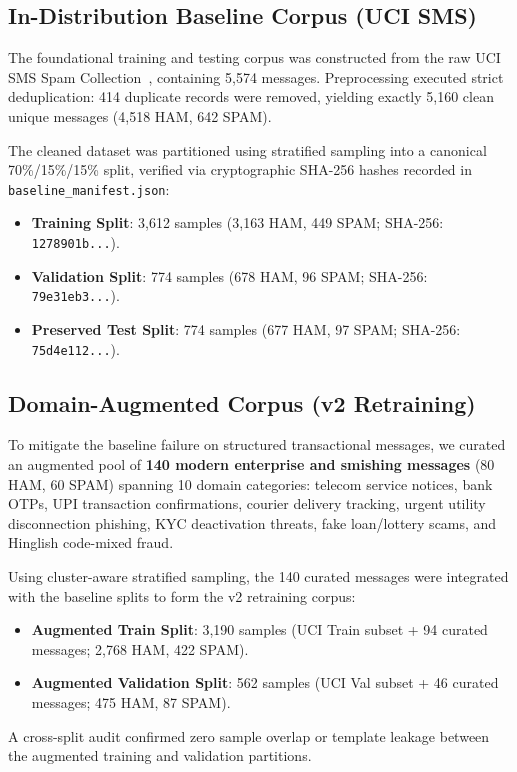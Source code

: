 \documentclass[conference]{IEEEtran}
\begin{document}
\subsection{In-Distribution Baseline Corpus (UCI SMS)}
The foundational training and testing corpus was constructed from the raw UCI SMS Spam Collection~\cite{almeida2011sms}, containing 5,574 messages. Preprocessing executed strict deduplication: 414 duplicate records were removed, yielding exactly 5,160 clean unique messages (4,518 HAM, 642 SPAM).

The cleaned dataset was partitioned using stratified sampling into a canonical 70\%/15\%/15\% split, verified via cryptographic SHA-256 hashes recorded in \texttt{baseline\_manifest.json}:
\begin{itemize}
    \item \textbf{Training Split}: 3,612 samples (3,163 HAM, 449 SPAM; SHA-256: \texttt{1278901b...}).
    \item \textbf{Validation Split}: 774 samples (678 HAM, 96 SPAM; SHA-256: \texttt{79e31eb3...}).
    \item \textbf{Preserved Test Split}: 774 samples (677 HAM, 97 SPAM; SHA-256: \texttt{75d4e112...}).
\end{itemize}

\subsection{Domain-Augmented Corpus (v2 Retraining)}
To mitigate the baseline failure on structured transactional messages, we curated an augmented pool of \textbf{140 modern enterprise and smishing messages} (80 HAM, 60 SPAM) spanning 10 domain categories: telecom service notices, bank OTPs, UPI transaction confirmations, courier delivery tracking, urgent utility disconnection phishing, KYC deactivation threats, fake loan/lottery scams, and Hinglish code-mixed fraud.

Using cluster-aware stratified sampling, the 140 curated messages were integrated with the baseline splits to form the v2 retraining corpus:
\begin{itemize}
    \item \textbf{Augmented Train Split}: 3,190 samples (UCI Train subset + 94 curated messages; 2,768 HAM, 422 SPAM).
    \item \textbf{Augmented Validation Split}: 562 samples (UCI Val subset + 46 curated messages; 475 HAM, 87 SPAM).
\end{itemize}
A cross-split audit confirmed zero sample overlap or template leakage between the augmented training and validation partitions.
\end{document}
